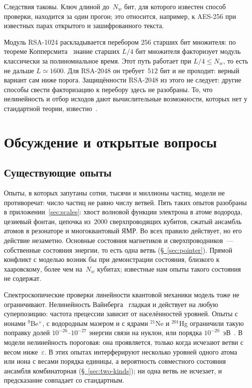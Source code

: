 \documentclass[11pt,a4paper]{article}
\begin{document}
Следствия таковы. Ключ длиной до~$N_w$ бит, для которого известен способ проверки, находится за один прогон; это относится, например, к AES-256 при известных парах открытого и зашифрованного текста.

Модуль RSA-1024 раскладывается перебором $256$ старших бит множителя: по теореме Копперсмита~\cite{coppersmith1997} знание старших $L/4$ бит множителя факторизует модуль классически за полиномиальное время. Этот путь работает при $L/4\le N_w$, то есть не дальше $L\simeq1600$. Для RSA-2048 он требует~$512$ бит и не проходит: верный вариант сам ниже порога. Защищённости RSA-2048 из этого не следует: другие способы свести факторизацию к перебору здесь не разобраны. То, что нелинейность и отбор исходов дают вычислительные возможности, которых нет у стандартной теории, известно~\cite{abramslloyd1998,aaronson2005}.

\section{Обсуждение и открытые вопросы}
\label{sec:discussion}

\subsection{Существующие опыты}
\label{sec:existing}

Опыты, в которых запутаны сотни, тысячи и миллионы частиц, модели не противоречат: число частиц не равно числу ветвей. Пять таких опытов разобраны в приложении~\ref{sec:scales}: хвост волновой функции электрона в атоме водорода, цезиевый фонтан, цепочка из~$2000$ сверхпроводящих кубитов, сжатый ансамбль атомов в резонаторе и многоквантовый ЯМР. Во всех правило действует, но его действие незаметно. Основные состояния магнетиков и сверхпроводников~--- собственные состояния энергии, то есть одна ветвь (\hyperref[sec:pointer]{\S~\ref*{sec:pointer}}). Прямой конфликт с моделью возник бы при демонстрации состояния, близкого к хааровскому, более чем на~$N_w$ кубитах; известные нам опыты такого состояния не содержат.

Спектроскопические проверки линейности квантовой механики модель тоже не ограничивают. Нелинейность Вайнберга~\cite{weinberg1989} гладкая и действует на любую суперпозицию: частота прецессии зависит от населённостей уровней. Опыты с ионами $^{9}$Be$^{+}$, с водородным мазером и с ядрами $^{21}$Ne и $^{201}$Hg ограничили такую поправку долей $10^{-26}$--$10^{-27}$ энергии связи на нуклон, или порядка $10^{-20}$~эВ~\cite{bollinger1989,walsworth1990,chupp1990,majumder1990}. В модели нелинейность пороговая: она проявляется, только когда исчезают ветви с весом ниже~$\varepsilon$. В этих опытах интерферируют несколько уровней одного атома или иона с весами порядка единицы, а вероятность совместного состояния ансамбля комбинаторная (\hyperref[sec:two-kinds]{\S~\ref*{sec:two-kinds}}); ни одна ветвь не исчезает, и предсказание совпадает со стандартным.
\end{document}

